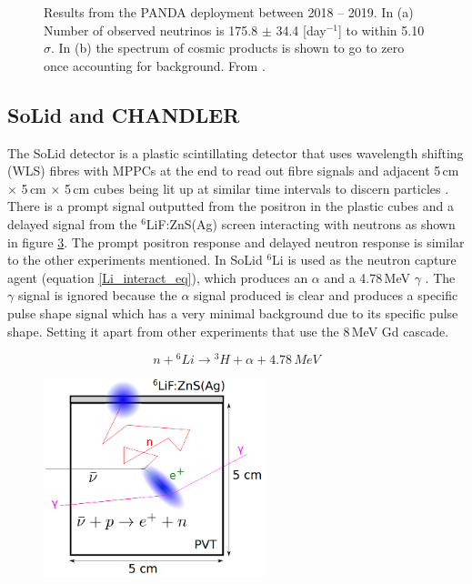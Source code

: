 \begin{figure}[!h]
\begin{subfigure}{.4\textwidth}
  \captionsetup{width=.9\linewidth}
  \caption{}
  \label{subFig:Panda_SpectrumOfCosmicProducts}
\end{subfigure}
\caption{Results from the PANDA deployment between 2018 -- 2019. In (a) Number of observed neutrinos is 175.8 $\pm$ 34.4 [day$^{-1}$] to within 5.10 $\sigma$. In (b) the spectrum of cosmic products is shown to go to zero once accounting for background. From \cite{IIRIE_Panda_2021}.}
\label{fig:Panda_spectrumOfIbdAndCosmicCandidates}
\end{figure}

\subsection{SoLid and CHANDLER}
The SoLid detector is a plastic scintillating detector that uses wavelength shifting (WLS) fibres with MPPCs at the end to read out fibre signals and adjacent 5\,cm $\times$ 5\,cm $\times$ 5\,cm cubes being lit up at similar time intervals to discern particles \cite{Solid_proposal}. There is a prompt signal outputted from the positron in the plastic cubes and a delayed signal from the $^6$LiF:ZnS(Ag) screen interacting with neutrons as shown in figure \ref{fig:SolidCubeDiagram}. The prompt positron response and delayed neutron response is similar to the other experiments mentioned. In SoLid $^6$Li is used as the neutron capture agent (equation \ref{Li_interact_eq}), which produces an $\alpha$ and a 4.78\,MeV $\gamma$ \cite{Solid_readout}. The $\gamma$ signal is ignored because the $\alpha$ signal produced is clear and produces a specific pulse shape signal \cite{Solid_readout} which has a very minimal background due to its specific pulse shape. Setting it apart from other experiments that use the 8\,MeV Gd cascade. 

\begin{equation}
n + {^6Li} \rightarrow {^3H} + \alpha +4.78\,MeV
\label{Li_interact_eq}
\end{equation}

\begin{figure}[!h]
 \centering
 \includegraphics[height=58mm]{Chapter2/Figs/Raster/SoLid_cube.png}
 \label{fig:SolidCubeDiagram}
\end{figure}

